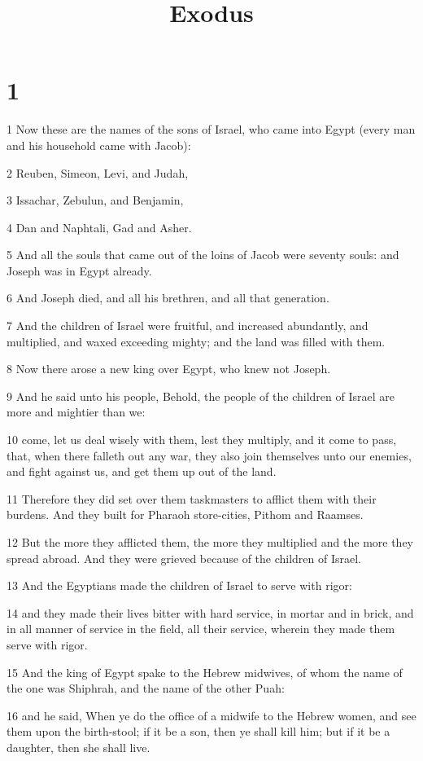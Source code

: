 

\title{Exodus}

\chapter{1}

\par 1 Now these are the names of the sons of Israel, who came into Egypt (every man and his household came with Jacob):
\par 2 Reuben, Simeon, Levi, and Judah,
\par 3 Issachar, Zebulun, and Benjamin,
\par 4 Dan and Naphtali, Gad and Asher.
\par 5 And all the souls that came out of the loins of Jacob were seventy souls: and Joseph was in Egypt already.
\par 6 And Joseph died, and all his brethren, and all that generation.
\par 7 And the children of Israel were fruitful, and increased abundantly, and multiplied, and waxed exceeding mighty; and the land was filled with them.
\par 8 Now there arose a new king over Egypt, who knew not Joseph.
\par 9 And he said unto his people, Behold, the people of the children of Israel are more and mightier than we:
\par 10 come, let us deal wisely with them, lest they multiply, and it come to pass, that, when there falleth out any war, they also join themselves unto our enemies, and fight against us, and get them up out of the land.
\par 11 Therefore they did set over them taskmasters to afflict them with their burdens. And they built for Pharaoh store-cities, Pithom and Raamses.
\par 12 But the more they afflicted them, the more they multiplied and the more they spread abroad. And they were grieved because of the children of Israel.
\par 13 And the Egyptians made the children of Israel to serve with rigor:
\par 14 and they made their lives bitter with hard service, in mortar and in brick, and in all manner of service in the field, all their service, wherein they made them serve with rigor.
\par 15 And the king of Egypt spake to the Hebrew midwives, of whom the name of the one was Shiphrah, and the name of the other Puah:
\par 16 and he said, When ye do the office of a midwife to the Hebrew women, and see them upon the birth-stool; if it be a son, then ye shall kill him; but if it be a daughter, then she shall live.

